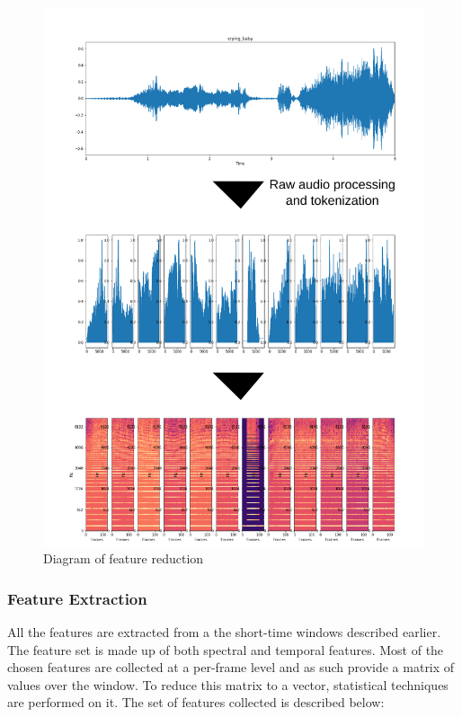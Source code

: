 \begin{figure}
    \centering
    \includegraphics{figures/processing_pipeline.svg}
    \caption{Diagram of feature reduction}
    \label{fig:my-label}
\end{figure}

\subsubsection{Feature Extraction}
All the features are extracted from a the short-time windows described earlier. 
The feature set is made up of both spectral and temporal features. Most of the chosen features are collected at a per-frame level and as such provide a matrix of values over the window. To reduce this matrix to a vector, statistical techniques are performed on it. The set of features collected is described below:

